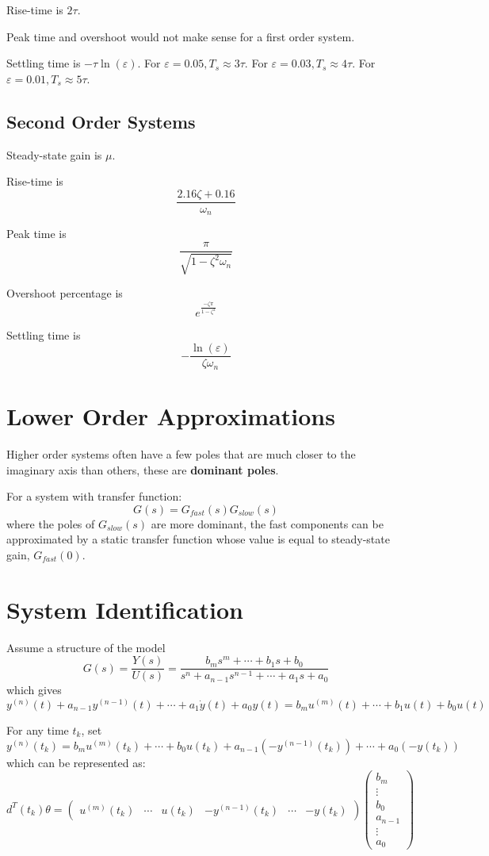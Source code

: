 \documentclass[11pt]{article}
\begin{document}
Rise-time is \(2 \tau\).

Peak time and overshoot would not make sense for a first order system.

Settling time is \(-\tau \ln(\varepsilon)\).
For \(\varepsilon = 0.05, T_{s} \approx 3\tau\).
For \(\varepsilon = 0.03, T_{s} \approx 4\tau\).
For \(\varepsilon = 0.01, T_{s} \approx 5\tau\).
\subsection{Second Order Systems}
\label{sec:org544a734}
Steady-state gain is \(\mu\).

Rise-time is
$$
\frac{2.16 \zeta + 0.16}{\omega_{n}}
$$

Peak time is
$$
\frac{\pi}{\sqrt{1 - \zeta^{2} \omega_{n}}}
$$

Overshoot percentage is
$$
e^{\frac{-\zeta \pi}{1 - \zeta^{2}}}
$$

Settling time is
$$
-\frac{\ln(\varepsilon)}{\zeta \omega_{n}}
$$
\section{Lower Order Approximations}
\label{sec:org3ea6cba}
Higher order systems often have a few poles that are much closer to the imaginary
axis than others, these are \textbf{dominant poles}.

For a system with transfer function:
$$
G(s) = G_{fast}(s) G_{slow}(s)
$$
where the poles of \(G_{slow}(s)\) are more dominant, the fast components can be
approximated by a static transfer function whose value is equal to steady-state
gain, \(G_{fast}(0)\).
\section{System Identification}
\label{sec:org3dcf00f}
Assume a structure of the model
$$G(s) = \frac{Y(s)}{U(s)} = \frac{b_{m} s^{m} + \cdots + b_{1} s + b_{0}}{s^{n} + a_{n-1} s^{n-1} + \cdots + a_{1} s + a_{0}}$$
which gives
$$y^{(n)}(t) + a_{n-1} y^{(n-1)}(t) + \cdots + a_{1} \dot{y}(t) + a_{0} y(t) = b_{m} u^{(m)}(t) + \cdots + b_{1} u(t) + b_{0} u(t)$$

For any time \(t_{k}\), set
$$
y^{(n)}(t_{k}) = b_{m}u^{(m)}(t_{k}) + \cdots + b_{0} u(t_{k})+ a_{n-1} \left( -y^{(n-1)} (t_{k}) \right) + \cdots + a_{0} (-y(t_{k}))
$$
which can be represented as:
$$ d^{T} (t_{k}) \theta = \begin{pmatrix} u^{(m)} (t_{k}) & \cdots & u(t_{k}) & -y^{(n-1)} (t_{k}) & \cdots & -y(t_{k}) \end{pmatrix} \begin{pmatrix} b_{m} \\ \vdots \\ b_{0} \\ a_{n-1} \\ \vdots \\ a_{0} \end{pmatrix} $$
\end{document}
